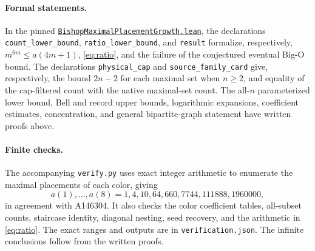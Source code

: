 \documentclass[11pt]{article}
\begin{document}
\paragraph{Formal statements.}
In the pinned
\href{https://github.com/the-omega-institute/trureturing/blob/549945461571e5d29c740b71d3b02651c85044f5/D5/S3/Combinatorics/Graph/Domination/BishopMaximalPlacementGrowth.lean}{\texttt{BishopMaximalPlacementGrowth.lean}},
the declarations \texttt{count\_lower\_bound},
\texttt{ratio\_lower\_bound}, and \texttt{result} formalize,
respectively, $m^{6m}\leq a(4m+1)$, \eqref{eq:ratio}, and the failure
of the conjectured eventual Big-O bound. The declarations
\texttt{physical\_cap} and \texttt{source\_family\_card} give, respectively,
the bound $2n-2$ for each maximal set when $n\geq2$, and equality of the
cap-filtered count with the native maximal-set count.
The all-$n$ parameterized lower bound, Bell and record upper bounds,
logarithmic expansions, coefficient estimates, concentration, and
general bipartite-graph statement have written proofs above.

\paragraph{Finite checks.}
The accompanying \texttt{verify.py} uses exact integer arithmetic to enumerate
the maximal placements of each color, giving
\[
 a(1),\ldots,a(8)=1,4,10,64,660,7744,111888,1960000,
\]
in agreement with A146304. It also checks the color coefficient tables,
all-subset counts, staircase identity, diagonal nesting, seed recovery,
and the arithmetic in \eqref{eq:ratio}. The exact ranges and outputs are
in \texttt{verification.json}. The infinite conclusions follow from the
written proofs.
\end{document}
